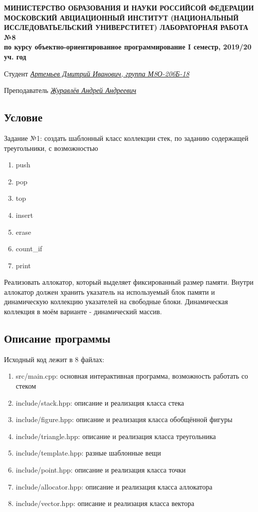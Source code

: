 \documentclass[12pt]{article}
\begin{document}
\begin{titlepage}
\begin{center}
\textbf{МИНИСТЕРСТВО ОБРАЗОВАНИЯ И НАУКИ РОССИЙСОЙ ФЕДЕРАЦИИ
\medskip
МОСКОВСКИЙ АВЦИАЦИОННЫЙ ИНСТИТУТ
(НАЦИОНАЛЬНЫЙ ИССЛЕДОВАТЬЕЛЬСКИЙ УНИВЕРСТИТЕТ)
\vfill\vfill
{\Huge ЛАБОРАТОРНАЯ РАБОТА №8} \\
по курсу объектно-ориентированное программирование
I семестр, 2019/20 уч. год}
\end{center}
\vfill

Студент \uline{\it {Артемьев Дмитрий Иванович, группа М8О-206Б-18}\hfill}

Преподаватель \uline{\it {Журавлёв Андрей Андреевич}\hfill}

\vfill
\end{titlepage}

\subsection*{Условие}

Задание №1: создать шаблонный класс коллекции стек, по заданию содержащей треугольники, с возможностью
\begin{enumerate}
\item push 
\item pop 
\item top 
\item insert 
\item erase 
\item count\_if
\item print
\end{enumerate}

Реализовать аллокатор, который выделяет фиксированный размер памяти. Внутри аллокатор должен хранить указатель на используемый блок памяти и динамическую коллекцию указателей на свободные блоки. Динамическая коллекция в моём варианте - динамический массив. 

\subsection*{Описание программы}

Исходный код лежит в 8 файлах:
\begin{enumerate}
\item src/main.cpp: основная интерактивная программа, возможность работать со стеком
\item include/stack.hpp: описание и реализация класса стека
\item include/figure.hpp: описание и реализация класса обобщённой фигуры
\item include/triangle.hpp: описание и реализация класса треугольника
\item include/template.hpp: разные шаблонные вещи
\item include/point.hpp: описание и реализация класса точки
\item include/allocator.hpp: описание и реализация класса аллокатора
\item include/vector.hpp: описание и реализация класса вектора
  
\end{enumerate}
\end{document}
